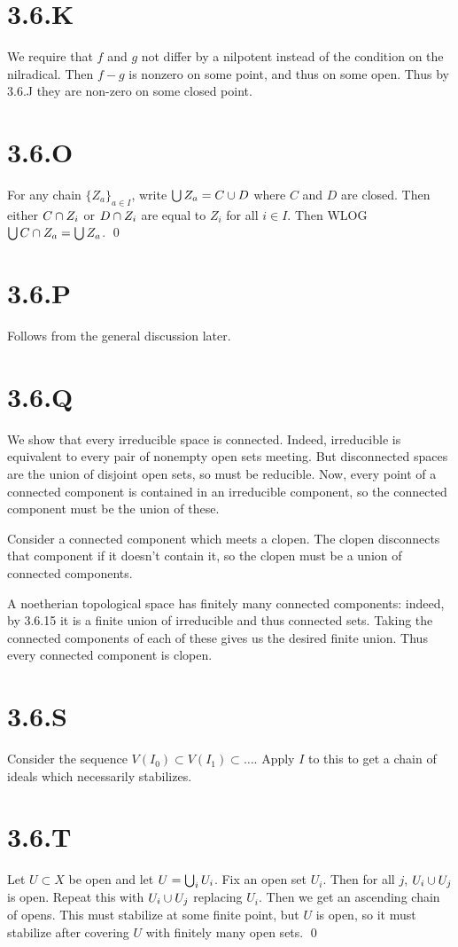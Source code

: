 \documentclass{article}
\begin{document}
\section{3.6.K}
We require that $f$ and $g$ not differ
by a nilpotent instead of the condition on the nilradical. Then
$f-g$ is nonzero on some point, and thus on some open. Thus
by 3.6.J they are non-zero on some closed point.

\section{3.6.O}
For any chain $\{Z_a\}_{a \in I}$, write $\bigcup Z_a=C \cup D$ where
$C$ and $D$ are closed. Then either
$C \cap Z_i$ or $D \cap Z_i$ are equal to
$Z_i$ for all $i \in I$. Then WLOG
$\bigcup C \cap Z_a=\bigcup Z_a$. \qed

\section{3.6.P}
Follows from the general discussion later.

\section{3.6.Q}
We show that every irreducible space is connected. Indeed, irreducible is
equivalent to every pair of nonempty open sets meeting. But disconnected spaces
are the union of disjoint open sets, so must be reducible. Now, every point of
a connected component is contained in an irreducible component, so the
connected component must be the union of these.

Consider a connected component which meets a clopen. The clopen disconnects
that component if it doesn't contain it, so the clopen must be a union of
connected components.

A noetherian topological space has finitely many connected components: indeed,
by 3.6.15 it is a finite union of irreducible and thus connected sets. Taking
the connected components of each of these gives us the desired finite union.
Thus every connected component is clopen.

\section{3.6.S}
Consider the sequence $V(I_0) \subset V(I_1) \subset \dots$. Apply $I$ to
this to get a chain of ideals which necessarily stabilizes.

\section{3.6.T}
Let $U \subset X$ be open and let $U=\bigcup_i U_i$. Fix an
open set $U_i$. Then for all $j$,
$U_i \cup U_j$ is open. Repeat this with $U_i \cup U_j$
replacing $U_i$. Then we get an ascending chain of opens.
This must stabilize at some finite point, but $U$ is open,
so it must stabilize after covering $U$ with finitely many
open sets. \qed
\end{document}
